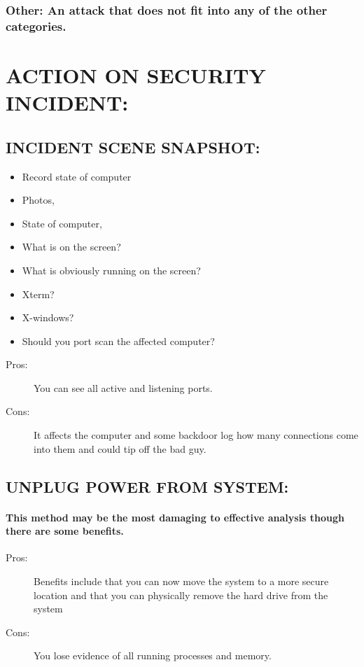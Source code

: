 \documentclass[10pt,british,english]{article}
\begin{document}
\subsubsection{Other: An attack that does not fit into any of the other categories.}

\section{ACTION ON SECURITY INCIDENT:}

\subsection{INCIDENT SCENE SNAPSHOT:}
\begin{itemize}
\item Record state of computer
\item Photos, 
\item State of computer, 
\item What is on the screen?
\item What is obviously running on the screen?
\item Xterm?
\item X-windows?
\item Should you port scan the affected computer?
\end{itemize}
\begin{description}
\item [{Pros:}] You can see all active and listening ports.
\item [{Cons:}] It affects the computer and some backdoor log how many
connections come into them and could tip off the bad guy.
\end{description}

\subsection{UNPLUG POWER FROM SYSTEM:}

\paragraph{This method may be the most damaging to effective analysis though
there are some benefits.}
\begin{description}
\item [{Pros:}] Benefits include that you can now move the system to a
more secure location and that you can physically remove the hard drive
from the system
\item [{Cons:}] You lose evidence of all running processes and memory.
\end{description}
%
\end{document}
